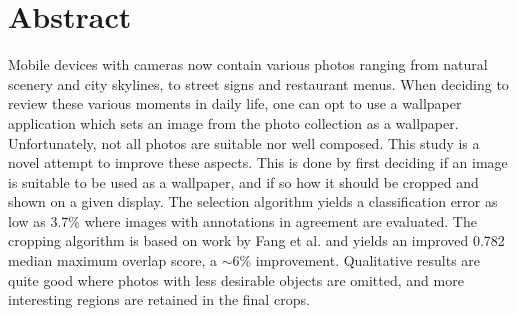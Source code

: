 %

\newpage
\vspace{3cm}

\chapter*{Abstract}
\noindent

Mobile devices with cameras now contain various photos ranging from natural
scenery and city skylines, to street signs and restaurant menus.
When deciding to review these various moments in daily life, one can opt to use
a wallpaper application which sets an image from the photo collection as a
wallpaper.
Unfortunately, not all photos are suitable nor well composed.
This study is a novel attempt to improve these aspects.
This is done by first deciding if an image is suitable to be used as a wallpaper,
and if so how it should be cropped and shown on a given display.
The selection algorithm yields a classification error as low as 3.7\% where images with annotations in agreement are evaluated.
The cropping algorithm is based on work by Fang et al. and yields an improved 0.782 median maximum overlap score, a $\sim6\%$ improvement.
Qualitative results are quite good where photos with less desirable objects are
omitted, and more interesting regions are retained in the final crops.
